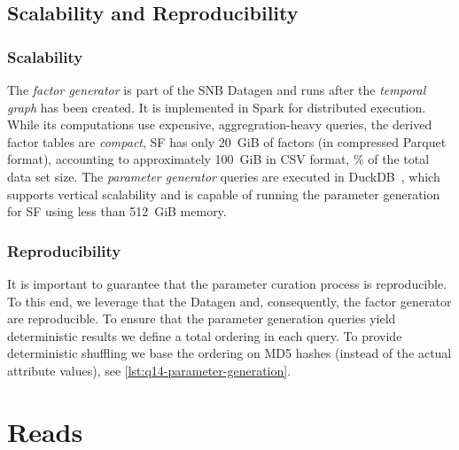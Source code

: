 \subsection{Scalability and Reproducibility}
\label{sec:paramgen-scalability}


\subsubsection{Scalability}
The \emph{factor generator} is part of the SNB Datagen and runs after the \textit{temporal graph} has been created.
It is implemented in Spark for distributed execution.
While its computations use expensive, aggregration-heavy queries, the derived factor tables are \emph{compact}, \eg SF has only 20~GiB of factors (in compressed Parquet format), accounting to approximately 100~GiB in CSV format, \% of the total data set size.
The \emph{parameter generator} queries are executed in DuckDB~\cite{DBLP:conf/sigmod/RaasveldtM19},
which supports vertical scalability and is capable of running the parameter generation for SF using less than 512~GiB memory.



\subsubsection{Reproducibility}
It is important to guarantee that the parameter curation process is reproducible.
To this end, we leverage that the Datagen and, consequently, the factor generator are reproducible.
To ensure that the parameter generation queries yield deterministic results we define a total ordering in each query.
To provide deterministic shuffling we base the ordering on MD5 hashes (instead of the actual attribute values), see \autoref{lst:q14-parameter-generation}.


\section{Reads}
\label{sec:bi-reads}

